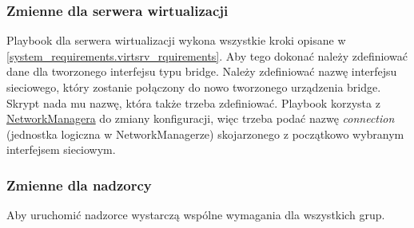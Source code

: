 \documentclass[../opis-rozwiazania.tex]{subfiles}
\begin{document}
\subsubsection{Zmienne dla serwera wirtualizacji}
Playbook dla serwera wirtualizacji wykona wszystkie kroki opisane w \ref{system_requirements.virtsrv_rquirements}.
Aby tego dokonać należy zdefiniować dane dla tworzonego interfejsu typu bridge.
Należy zdefiniować nazwę interfejsu sieciowego, który zostanie połączony do nowo tworzonego urządzenia bridge.
Skrypt nada mu nazwę, która także trzeba zdefiniować.
Playbook korzysta z \href{https://networkmanager.dev/}{NetworkManagera} do zmiany konfiguracji, więc trzeba podać nazwę \textit{connection} (jednostka logiczna w NetworkManagerze) skojarzonego z początkowo wybranym interfejsem sieciowym.

\subsubsection{Zmienne dla nadzorcy}
Aby uruchomić nadzorce wystarczą wspólne wymagania dla wszystkich grup.
	
\end{document}
